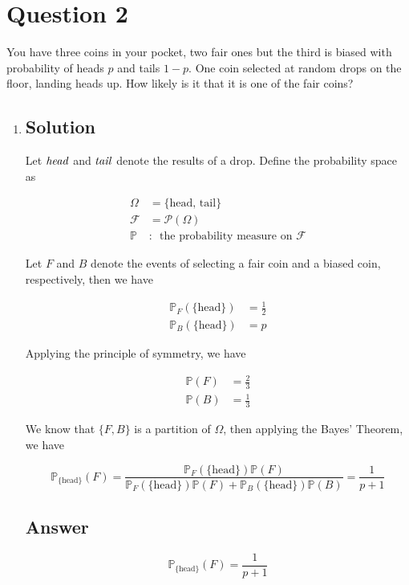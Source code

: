 \documentclass[12pt]{article}
\newcommand{\bP}{\mathbb{P}}
\begin{document}
	
	\section*{Question 2}
	
	\noindent You have three coins in your pocket, two fair ones but the third is biased with probability of heads $p$ and tails $1-p$. One coin selected at random drops on the floor, landing heads up. How likely is it that it is one of the fair coins?
	
	\begin{enumerate}[label={},leftmargin=0in]\item
		
		\subsection*{Solution}
		
			Let $\it{head}$ and $\it{tail}$ denote the results of a drop. Define the probability space as
		
			\[
			\begin{aligned}
				\Omega &= \{\mathrm{head},\,\mathrm{tail}\}\\
				\mathcal{F} &= \mathcal{P}(\Omega)\\
				\bP &:\enspace \text{the probability measure on $\mathcal{F}$}
			\end{aligned}
			\]
			
			Let $F$ and $B$ denote the events of selecting a fair coin and a biased coin, respectively, then we have
			
			\[
			\begin{aligned}
				\bP_F(\{\mathrm{head}\}) &= \frac{1}{2}\\
				\bP_B(\{\mathrm{head}\}) &= p
			\end{aligned}
			\]
			
			Applying the principle of symmetry, we have
			
			\[
			\begin{aligned}
				\bP(F) &= \frac{2}{3}\\
				\bP(B) &= \frac{1}{3}
			\end{aligned}
			\]
			
			We know that $\{F,B\}$ is a partition of $\Omega$, then applying the Bayes’ Theorem, we have
			
			\[{\bP_{\{\mathrm{head}\}}}(F) = \frac{\bP_F(\{\mathrm{head}\})\bP(F)}{\bP_F(\{\mathrm{head}\})\bP(F) + \bP_B(\{\mathrm{head}\})\bP(B)} = \frac{1}{p+1}\]
		
		\subsection*{Answer}
		
			\[\boxed{{\bP_{\{\mathrm{head}\}}}(F) = \frac{1}{p+1}}\]

	\end{enumerate}
\end{document}
